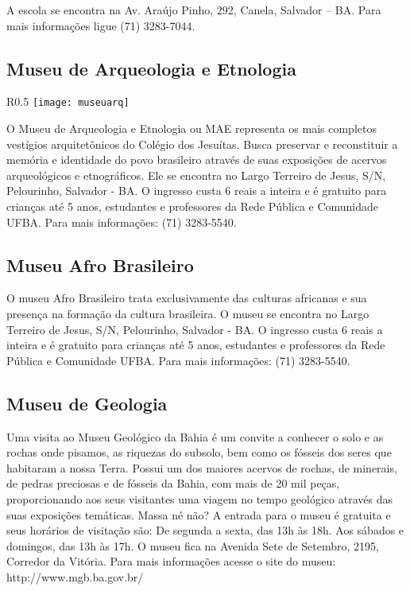 A escola se encontra na Av. Araújo Pinho, 292, Canela, Salvador – BA. Para mais informações ligue (71) 3283-7044.

\subsection {Museu de Arqueologia e Etnologia}
\begin{wrapfigure}{R}{0.5\textwidth}
	\texttt{[image: museuarq]}
\end{wrapfigure}  

O Museu de Arqueologia e Etnologia ou MAE representa os mais completos vestígios arquitetônicos do Colégio dos Jesuítas. Busca preservar e reconstituir a memória e identidade do povo brasileiro através de suas exposições de acervos arqueológicos e etnográficos. Ele se encontra no Largo Terreiro de Jesus, S/N, Pelourinho, Salvador - BA. O ingresso custa 6 reais a inteira e é gratuito para crianças até 5 anos, estudantes e professores da Rede Pública e Comunidade UFBA. Para mais informações: (71) 3283-5540.
                    
\subsection {Museu Afro Brasileiro}  

O museu Afro Brasileiro trata exclusivamente das culturas africanas e sua presença na formação da cultura brasileira. O museu se encontra no Largo Terreiro de Jesus, S/N, Pelourinho, Salvador - BA. O ingresso custa 6 reais a inteira e é gratuito para crianças até 5 anos, estudantes e professores da Rede Pública e Comunidade UFBA. Para mais informações: (71) 3283-5540.
                    
\subsection {Museu de Geologia} 
                    
Uma visita ao Museu Geológico da Bahia é um convite a conhecer o solo e as rochas onde pisamos, as riquezas do subsolo, bem como os fósseis dos seres que habitaram a nossa Terra. Possui um dos maiores acervos de rochas, de minerais, de pedras preciosas e de fósseis da Bahia, com mais de 20 mil peças, proporcionando aos seus visitantes uma viagem no tempo geológico através das suas exposições temáticas. Massa né não?
                	A entrada para o museu é gratuita e seus horários de visitação são:
	                De segunda a sexta, das 13h às 18h.
	                Aos sábados e domingos, das 13h às 17h.
	                O museu fica na Avenida Sete de Setembro, 2195, Corredor da Vitória.
                    Para mais informações acesse o site do museu: http://www.mgb.ba.gov.br/
	                \newpage
